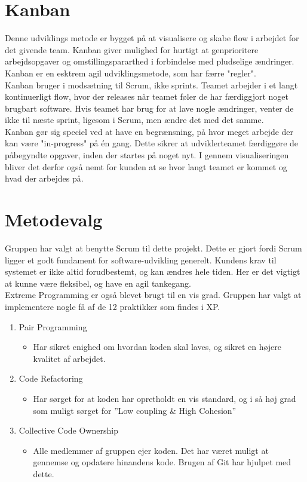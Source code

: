 \section{Kanban}\label{sec:kanban}
Denne udviklings metode er bygget på at visualisere og skabe flow i arbejdet for det givende team. Kanban giver 
mulighed for hurtigt at genprioritere arbejdsopgaver og omstillingspararthed i forbindelse med pludselige ændringer. 
Kanban er en esktrem agil udviklingsmetode, som har færre "regler".\\

Kanban\cite{ScrumArchitecture} bruger i modsætning til Scrum, ikke sprints. Teamet arbejder i et langt kontinuerligt flow, hvor der releases
når teamet føler de har færdiggjort noget brugbart software. Hvis teamet har brug for at lave nogle ændringer,
venter de ikke til næste sprint, ligesom i Scrum, men ændre det med det samme. \\

Kanban gør sig speciel ved at have en begrænsning, på hvor meget arbejde der kan være "in-progress" på én gang. 
Dette sikrer at udviklerteamet færdiggøre de påbegyndte opgaver, inden der startes på noget nyt. 
I gennem visualiseringen bliver det derfor også nemt for kunden at se hvor langt teamet er kommet og
hvad der arbejdes på.

\section{Metodevalg}\label{sec:valgafvaektoej}
Gruppen har valgt at benytte Scrum til dette projekt. Dette er gjort fordi Scrum ligger et godt fundament 
for software-udvikling generelt. Kundens krav til systemet er ikke altid forudbestemt, og kan ændres hele tiden. 
Her er det vigtigt at kunne være fleksibel, og have en agil tankegang. \\
Extreme Programming er også blevet brugt til en vis grad. Gruppen har valgt at implementere nogle få 
af de 12 praktikker som findes i XP. 
\begin{enumerate}
    \item Pair Programming
    \begin{itemize}
        \item Har sikret enighed om hvordan koden skal laves, og sikret en højere kvalitet af arbejdet.
    \end{itemize}

    \item Code Refactoring
    \begin{itemize}
        \item Har sørget for at koden har opretholdt en vis standard, og i så høj grad som muligt sørget for ”Low coupling \& High Cohesion”
    \end{itemize}
    
    \item Collective Code Ownership
    \begin{itemize}
        \item Alle medlemmer af gruppen ejer koden. Det har været muligt at gennemse og opdatere hinandens kode. 
        Brugen af Git har hjulpet med dette. 
    \end{itemize}
\end{enumerate}

